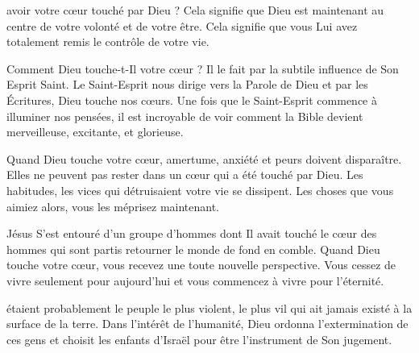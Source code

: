 
 avoir votre cœur touché par Dieu ?
 Cela signifie que Dieu est maintenant au centre de votre volonté
 et de votre être.
 Cela signifie que vous Lui avez totalement remis le contrôle de votre vie.

Comment Dieu touche-t-Il votre cœur ?
 Il le fait par la subtile influence de Son Esprit Saint. 
 Le Saint-Esprit nous dirige vers la Parole de Dieu et par les Écritures,
 Dieu touche nos cœurs.
 Une fois que le Saint-Esprit commence à illuminer nos pensées,
 il est incroyable de voir comment la Bible devient merveilleuse,
 excitante, et glorieuse.

Quand Dieu touche votre cœur, amertume, anxiété et peurs doivent disparaître.
 Elles ne peuvent pas rester dans un cœur qui a été touché par Dieu.
 Les habitudes, les vices qui détruisaient votre vie se dissipent.
 Les choses que vous aimiez alors, vous les méprisez maintenant.


Jésus S'est entouré d'un groupe d'hommes dont Il avait touché le cœur
 \ocadr des hommes qui sont partis retourner le monde de fond en comble.
 Quand Dieu touche votre cœur, vous recevez une toute nouvelle perspective.
 Vous cessez de vivre seulement pour aujourd'hui et vous commencez
 à vivre pour l'éternité. 

\dvrule






 étaient probablement le peuple le plus violent,
 le plus vil qui ait jamais existé à la surface de la terre.
 Dans l'intérêt de l'humanité, Dieu ordonna l'extermination de ces gens
 et choisit les enfants d'Israël pour être l'instrument de Son jugement.


